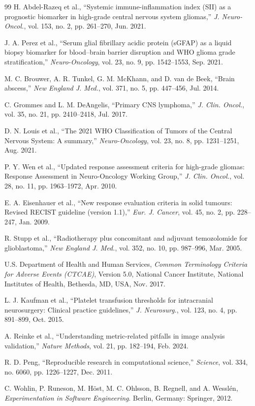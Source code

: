 \documentclass[journal,onecolumn,10pt]{IEEEtran}
\begin{document}
\begin{thebibliography}{99}
H. Abdel-Razeq et al., ``Systemic immune-inflammation index (SII) as a prognostic biomarker in high-grade central nervous system gliomas,'' \textit{J. Neuro-Oncol.}, vol. 153, no. 2, pp. 261--270, Jun. 2021.

J. A. Perez et al., ``Serum glial fibrillary acidic protein (sGFAP) as a liquid biopsy biomarker for blood--brain barrier disruption and WHO glioma grade stratification,'' \textit{Neuro-Oncology}, vol. 23, no. 9, pp. 1542--1553, Sep. 2021.

M. C. Brouwer, A. R. Tunkel, G. M. McKhann, and D. van de Beek, ``Brain abscess,'' \textit{New England J. Med.}, vol. 371, no. 5, pp. 447--456, Jul. 2014.

C. Grommes and L. M. DeAngelis, ``Primary CNS lymphoma,'' \textit{J. Clin. Oncol.}, vol. 35, no. 21, pp. 2410--2418, Jul. 2017.

D. N. Louis et al., ``The 2021 WHO Classification of Tumors of the Central Nervous System: A summary,'' \textit{Neuro-Oncology}, vol. 23, no. 8, pp. 1231--1251, Aug. 2021.

P. Y. Wen et al., ``Updated response assessment criteria for high-grade gliomas: Response Assessment in Neuro-Oncology Working Group,'' \textit{J. Clin. Oncol.}, vol. 28, no. 11, pp. 1963--1972, Apr. 2010.

E. A. Eisenhauer et al., ``New response evaluation criteria in solid tumours: Revised RECIST guideline (version 1.1),'' \textit{Eur. J. Cancer}, vol. 45, no. 2, pp. 228--247, Jan. 2009.

R. Stupp et al., ``Radiotherapy plus concomitant and adjuvant temozolomide for glioblastoma,'' \textit{New England J. Med.}, vol. 352, no. 10, pp. 987--996, Mar. 2005.

U.S. Department of Health and Human Services, \textit{Common Terminology Criteria for Adverse Events (CTCAE)}, Version 5.0, National Cancer Institute, National Institutes of Health, Bethesda, MD, USA, Nov. 2017.

L. J. Kaufman et al., ``Platelet transfusion thresholds for intracranial neurosurgery: Clinical practice guidelines,'' \textit{J. Neurosurg.}, vol. 123, no. 4, pp. 891--899, Oct. 2015.

A. Reinke et al., ``Understanding metric-related pitfalls in image analysis validation,'' \textit{Nature Methods}, vol. 21, pp. 182--194, Feb. 2024.

R. D. Peng, ``Reproducible research in computational science,'' \textit{Science}, vol. 334, no. 6060, pp. 1226--1227, Dec. 2011.

C. Wohlin, P. Runeson, M. H\"{o}st, M. C. Ohlsson, B. Regnell, and A. Wessl\'{e}n, \textit{Experimentation in Software Engineering}. Berlin, Germany: Springer, 2012.

\end{thebibliography}
\end{document}
